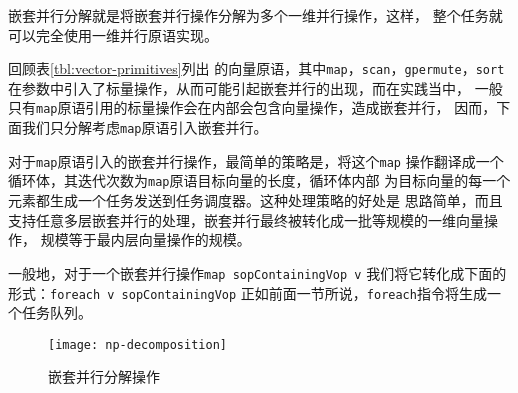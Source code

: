 嵌套并行分解就是将嵌套并行操作分解为多个一维并行操作，这样，
整个任务就可以完全使用一维并行原语实现。

回顾表\ref{tbl:vector-primitives}列出
的向量原语，其中\texttt{map}，\texttt{scan}，\texttt{gpermute}，\texttt{sort}
在参数中引入了标量操作，从而可能引起嵌套并行的出现，而在实践当中，
一般只有\texttt{map}原语引用的标量操作会在内部会包含向量操作，造成嵌套并行，
因而，下面我们只分解考虑\texttt{map}原语引入嵌套并行。

对于\texttt{map}原语引入的嵌套并行操作，最简单的策略是，将这个\texttt{map}
操作翻译成一个循环体，其迭代次数为\texttt{map}原语目标向量的长度，循环体内部
为目标向量的每一个元素都生成一个任务发送到任务调度器。这种处理策略的好处是
思路简单，而且支持任意多层嵌套并行的处理，嵌套并行最终被转化成一批等规模的一维向量操作，
规模等于最内层向量操作的规模。

一般地，对于一个嵌套并行操作\texttt{map sopContainingVop v}
我们将它转化成下面的形式：\texttt{foreach v sopContainingVop}
正如前面一节所说，\texttt{foreach}指令将生成一个任务队列。


\begin{quotation}
\end{quotation}
\begin{figure}
  \centering
  \texttt{[image: np-decomposition]}
  \caption{嵌套并行分解操作}
  \label{fig:np-decomposition}
\end{figure}

